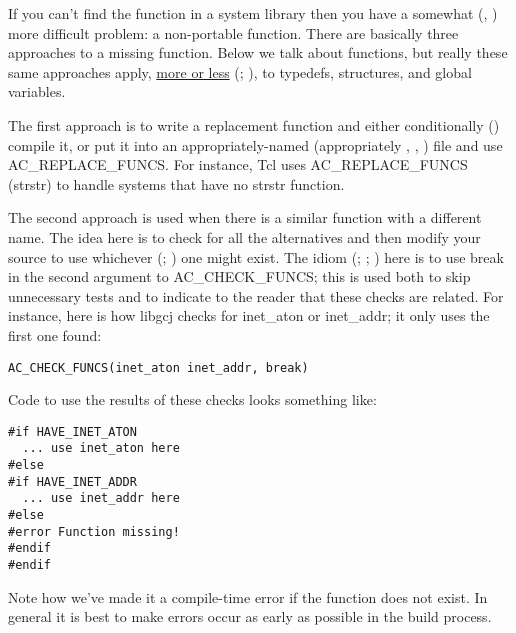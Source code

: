 If you can't find the function in a system library then you have a 
somewhat ({\MbQ{}}, {\MhQ{}}) more difficult problem: a non-portable function.
There are basically three approaches to a missing function. Below we talk about 
functions, but really these same approaches apply,
\underline{more or less} ({\MaQ{}}; {\MaQ{}}), to typedefs, structures,
and global variables.  

The first approach is to write a replacement function and either 
conditionally ({\McQ{}}) compile it, or put it into an 
appropriately-named (appropriately {\MjQ{}}, {\MaQ{}}, {\MbQ{}}) file and use 
AC\_{}REPLACE\_{}FUNCS. For instance, Tcl uses AC\_{}REPLACE\_{}FUNCS (strstr) 
to handle systems that have no strstr function. 


The second approach is used when there is a similar function with a different 
name. The idea here is to check for all the alternatives and then modify 
your source to use whichever ({\MbQ{}}; {\MbQ{}}) one might exist.
The idiom ({\MfQ{}}; {\MbQ{}}; {\McQ{}}) here is to use break in the second 
argument to AC\_{}CHECK\_{}FUNCS; this is used both to skip unnecessary tests 
and to indicate to the reader that these checks are related. For instance,
here is how libgcj checks for inet\_{}aton or inet\_{}addr; it only uses 
the first one found:

\begin{Verbatim}[frame=single]
AC_CHECK_FUNCS(inet_aton inet_addr, break)
\end{Verbatim}

Code to use the results of these checks looks something like: 


\begin{Verbatim}[frame=single]
#if HAVE_INET_ATON
  ... use inet_aton here
#else
#if HAVE_INET_ADDR
  ... use inet_addr here
#else
#error Function missing!
#endif
#endif
\end{Verbatim}

Note how we've made it a compile-time error if the function does not exist.
In general it is best to make errors occur as early as possible in the 
build process. 


